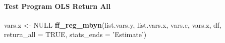 \documentclass[
]{book}
\newenvironment{Shaded}{\begin{snugshade}}{\end{snugshade}}
\newcommand{\DataTypeTok}[1]{\textcolor[rgb]{0.13,0.29,0.53}{#1}}
\newcommand{\KeywordTok}[1]{\textcolor[rgb]{0.13,0.29,0.53}{\textbf{#1}}}
\newcommand{\NormalTok}[1]{#1}
\newcommand{\OtherTok}[1]{\textcolor[rgb]{0.56,0.35,0.01}{#1}}
\newcommand{\StringTok}[1]{\textcolor[rgb]{0.31,0.60,0.02}{#1}}
\begin{document}
\hypertarget{test-program-ols-return-all}{%
\paragraph{Test Program OLS Return All}\label{test-program-ols-return-all}}

\begin{Shaded}
\begin{Highlighting}[]
\NormalTok{vars.z <-}\StringTok{ }\OtherTok{NULL}
\KeywordTok{ff_reg_mbyn}\NormalTok{(list.vars.y, list.vars.x,}
\NormalTok{            vars.c, vars.z, df,}
            \DataTypeTok{return_all =} \OtherTok{TRUE}\NormalTok{,}
            \DataTypeTok{stats_ends =} \StringTok{'Estimate'}\NormalTok{)}
\end{Highlighting}
\end{Shaded}
\end{document}
